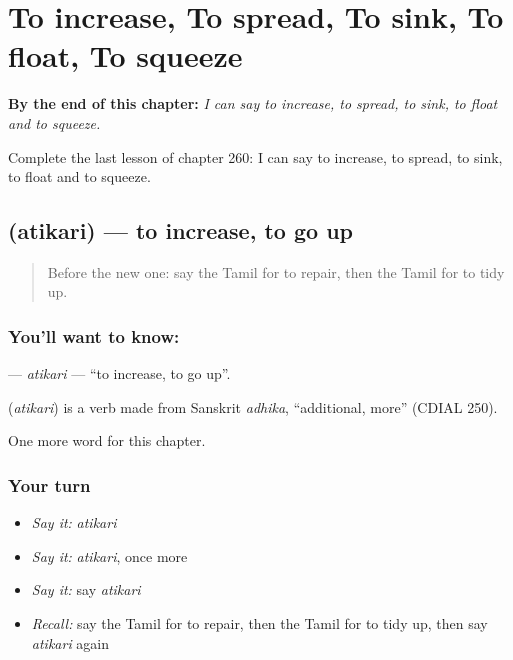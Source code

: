 
\chapter{To increase, To spread, To sink, To float, To squeeze}
\label{ch:ta-to-increase-to-spread-to-sink-to-float-to-squeeze}

\begin{chapteropening}
\textbf{By the end of this chapter:} \emph{I can say to increase, to spread, to sink, to float and to squeeze.}

Complete the last lesson of chapter 260: I can say to increase, to spread, to sink, to float and to squeeze.
\end{chapteropening}

\section[\texorpdfstring{\ta{அதிகரி} (atikari)}{அதிகரி (atikari)}]{ (atikari) — to increase, to go up}

\label{lesson:TA-C260-atikari2}



\begin{quote}
Before the new one: say the Tamil for to repair, then the Tamil for to tidy up.
\end{quote}

\subsection*{You'll want to know: }
\textbf{} — \emph{atikari} — \textquotedblleft{}to increase, to go up\textquotedblright{}.

\begin{cousinweb}
\textbf{} (\emph{atikari}) is a verb made from Sanskrit \emph{adhika}, \textquotedblleft{}additional, more\textquotedblright{} (CDIAL 250).
\end{cousinweb}

\begin{grammarlens}[title={What you've built}]
One more word for this chapter.
\end{grammarlens}

\subsection*{Your turn}
\begin{itemize}
\raggedright
  \item \emph{Say it:} \emph{atikari}
  \item \emph{Say it:} \emph{atikari}, once more
  \item \emph{Say it:} say \emph{atikari}
  \item \emph{Recall:} say the Tamil for to repair, then the Tamil for to tidy up, then say \emph{atikari} again
\end{itemize}

